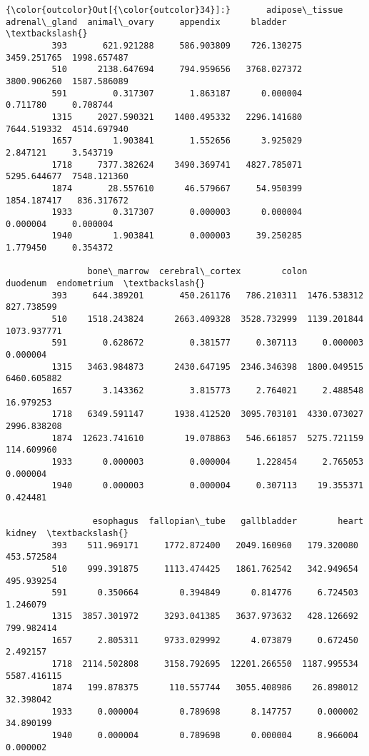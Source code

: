 \documentclass[11pt]{article}
\begin{document}
\begin{Verbatim}[commandchars=\\\{\}]
{\color{outcolor}Out[{\color{outcolor}34}]:}       adipose\_tissue  adrenal\_gland  animal\_ovary     appendix      bladder  \textbackslash{}
         393       621.921288     586.903809    726.130275  3459.251765  1998.657487   
         510      2138.647694     794.959656   3768.027372  3800.906260  1587.586089   
         591         0.317307       1.863187      0.000004     0.711780     0.708744   
         1315     2027.590321    1400.495332   2296.141680  7644.519332  4514.697940   
         1657        1.903841       1.552656      3.925029     2.847121     3.543719   
         1718     7377.382624    3490.369741   4827.785071  5295.644677  7548.121360   
         1874       28.557610      46.579667     54.950399  1854.187417   836.317672   
         1933        0.317307       0.000003      0.000004     0.000004     0.000004   
         1940        1.903841       0.000003     39.250285     1.779450     0.354372   
         
                bone\_marrow  cerebral\_cortex        colon     duodenum  endometrium  \textbackslash{}
         393     644.389201       450.261176   786.210311  1476.538312   827.738599   
         510    1518.243824      2663.409328  3528.732999  1139.201844  1073.937771   
         591       0.628672         0.381577     0.307113     0.000003     0.000004   
         1315   3463.984873      2430.647195  2346.346398  1800.049515  6460.605882   
         1657      3.143362         3.815773     2.764021     2.488548    16.979253   
         1718   6349.591147      1938.412520  3095.703101  4330.073027  2996.838208   
         1874  12623.741610        19.078863   546.661857  5275.721159   114.609960   
         1933      0.000003         0.000004     1.228454     2.765053     0.000004   
         1940      0.000003         0.000004     0.307113    19.355371     0.424481   
         
                 esophagus  fallopian\_tube   gallbladder        heart       kidney  \textbackslash{}
         393    511.969171     1772.872400   2049.160960   179.320080   453.572584   
         510    999.391875     1113.474425   1861.762542   342.949654   495.939254   
         591      0.350664        0.394849      0.814776     6.724503     1.246079   
         1315  3857.301972     3293.041385   3637.973632   428.126692   799.982414   
         1657     2.805311     9733.029992      4.073879     0.672450     2.492157   
         1718  2114.502808     3158.792695  12201.266550  1187.995534  5587.416115   
         1874   199.878375      110.557744   3055.408986    26.898012    32.398042   
         1933     0.000004        0.789698      8.147757     0.000002    34.890199   
         1940     0.000004        0.789698      0.000004     8.966004     0.000002   
         

\end{Verbatim}
\end{document}

